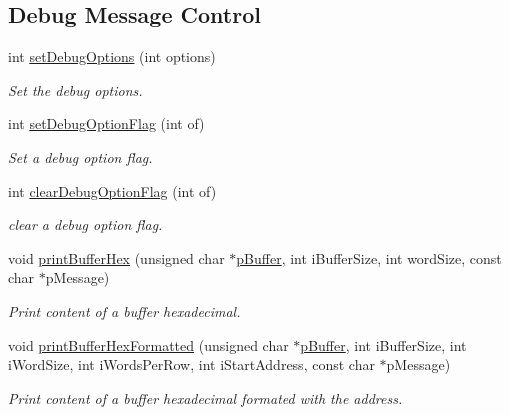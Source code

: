 \subsection*{Debug Message Control}
\begin{CompactItemize}
\item 
int \hyperlink{group__dcsc__msg__buffer__access_gc07186b103fbe4c39531665c95e22c7e}{set\-Debug\-Options} (int options)
\begin{CompactList}\small\item\em Set the debug options. \item\end{CompactList}\item 
int \hyperlink{group__dcsc__msg__buffer__access_g36bb01dae6dd6edf579fe9878f9c6a20}{set\-Debug\-Option\-Flag} (int of)
\begin{CompactList}\small\item\em Set a debug option flag. \item\end{CompactList}\item 
int \hyperlink{group__dcsc__msg__buffer__access_g41201fc4dd5608bce4261b34eec28ca4}{clear\-Debug\-Option\-Flag} (int of)
\begin{CompactList}\small\item\em clear a debug option flag. \item\end{CompactList}\item 
void \hyperlink{group__dcsc__msg__buffer__access_g1b3027d209be85e9a8fbd14864c4b442}{print\-Buffer\-Hex} (unsigned char $\ast$\hyperlink{dcscMsgBufferInterface_8c_7fe69f55846ac3a138c130665f1f1e49}{p\-Buffer}, int i\-Buffer\-Size, int word\-Size, const char $\ast$p\-Message)
\begin{CompactList}\small\item\em Print content of a buffer hexadecimal. \item\end{CompactList}\item 
void \hyperlink{group__dcsc__msg__buffer__access_gc44ca908f157f8de95b81638e298e08e}{print\-Buffer\-Hex\-Formatted} (unsigned char $\ast$\hyperlink{dcscMsgBufferInterface_8c_7fe69f55846ac3a138c130665f1f1e49}{p\-Buffer}, int i\-Buffer\-Size, int i\-Word\-Size, int i\-Words\-Per\-Row, int i\-Start\-Address, const char $\ast$p\-Message)
\begin{CompactList}\small\item\em Print content of a buffer hexadecimal formated with the address. \item\end{CompactList}\end{CompactItemize}


